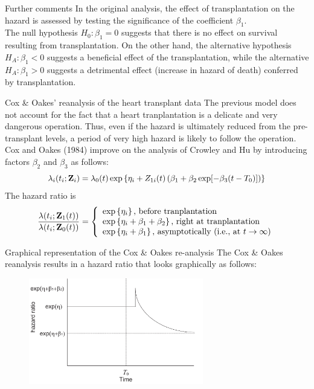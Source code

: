 \documentclass[envcountsect, 10pt, portrait, palatino]{beamer}
\newcommand{\bfZ}{{\mbox{{\bf Z}}}}
\begin{document}
\begin{frame}{Further comments}
In the original analysis, the effect of transplantation on the hazard is assessed by testing the significance of the coefficient $\beta_1$.
\\[2ex]
The null hypothesis $H_0: \beta_1=0$ suggests that there is no effect on survival resulting from transplantation. On the other hand, the alternative hypothesis $H_A: \beta_1<0$ suggests a beneficial effect of the transplantation, while the alternative $H_A: \beta_1>0$ suggests a detrimental effect (increase in hazard of death) conferred by transplantation.
\end{frame} 
\begin{frame}{Cox \& Oakes' reanalysis of the heart transplant data}
The previous model does not account for the fact that a heart tranplantation is a delicate and very dangerous operation.  Thus, even if the hazard is ultimately reduced from the pre-transplant levels, a period of very high hazard is likely to follow the operation.  Cox and Oakes (1984) improve on the analysis of Crowley and Hu by introducing factors $\beta_2$ and $\beta_3$ as follows:
$$
\lambda_i(t_i;\bfZ_i)=\lambda_0(t)\exp\left \{ \eta_i+Z_{1i}(t)\left (\beta_1+\beta_2\exp[-\beta_3(t-T_0)]\right )\right \}
$$
The hazard ratio is
$$
\frac{\lambda(t_i;\bfZ_1(t))}{\lambda(t_i;\bfZ_0(t))}=\left \{ \begin{array}{l}
   \exp\left \{ \eta_i\right \}\mbox{, before tranplantation}\\
   \exp\left \{ \eta_i+\beta_1+\beta_2 \right \}\mbox{, right at tranplantation}\\
   \exp\left \{ \eta_i+\beta_1\right \}\mbox{, asymptotically (i.e., at $t\rightarrow\infty$})\\
\end{array}\right .
$$
\end{frame} 
\begin{frame}{Graphical representation of the Cox \& Oakes re-analysis}
The Cox \& Oakes reanalysis results in a hazard ratio that looks graphically as follows:
\begin{figure}[ht]
\centerline{\includegraphics[width=3in]{lect8_g3.pdf}}
\end{figure}
\end{frame} 
\end{document}

